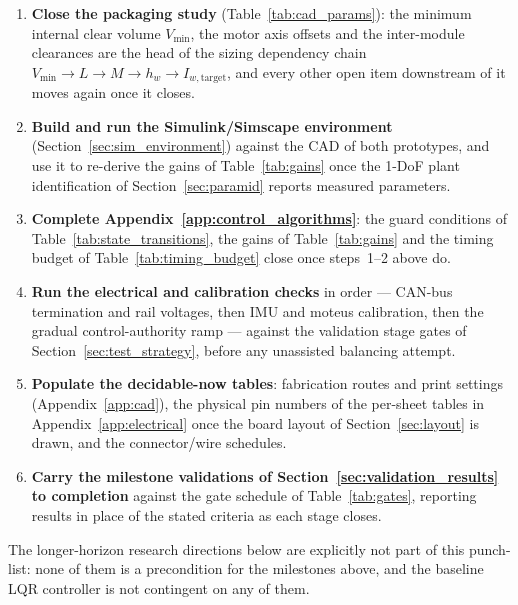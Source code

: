\begin{enumerate}
  \item \textbf{Close the packaging study} (Table~\ref{tab:cad_params}): the
        minimum internal clear volume $V_{\min}$, the motor axis offsets and
        the inter-module clearances are the head of the sizing dependency
        chain $V_{\min}\to L\to M\to h_w\to I_{w,\text{target}}$, and every
        other open item downstream of it moves again once it closes.
  \item \textbf{Build and run the Simulink/Simscape environment}
        (Section~\ref{sec:sim_environment}) against the CAD of both
        prototypes, and use it to re-derive the gains of
        Table~\ref{tab:gains} once the 1-DoF plant identification of
        Section~\ref{sec:paramid} reports measured parameters.
  \item \textbf{Complete Appendix~\ref{app:control_algorithms}}: the guard
        conditions of Table~\ref{tab:state_transitions}, the gains of
        Table~\ref{tab:gains} and the timing budget of
        Table~\ref{tab:timing_budget} close once steps~1--2 above do.
  \item \textbf{Run the electrical and calibration checks} in order --- CAN-bus
        termination and rail voltages, then IMU and moteus calibration, then
        the gradual control-authority ramp --- against the validation stage
        gates of Section~\ref{sec:test_strategy}, before any unassisted
        balancing attempt.
  \item \textbf{Populate the decidable-now tables}: fabrication routes and
        print settings (Appendix~\ref{app:cad}), the physical pin numbers of
        the per-sheet tables in Appendix~\ref{app:electrical} once the board
        layout of Section~\ref{sec:layout} is drawn, and the connector/wire
        schedules.
  \item \textbf{Carry the milestone validations of
        Section~\ref{sec:validation_results} to completion} against the gate
        schedule of Table~\ref{tab:gates}, reporting results in place of the
        stated criteria as each stage closes.
\end{enumerate}

The longer-horizon research directions below are explicitly not part of this
punch-list: none of them is a precondition for the milestones above, and the
baseline LQR controller is not contingent on any of them.


